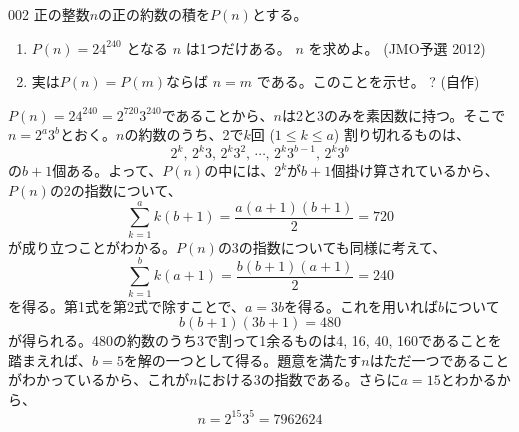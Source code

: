 \begin{thm}{002}{}{}
 正の整数$n$の正の約数の積を$P(n)$とする。
 \begin{enumerate}
  \item $P(n)=24^{240}$ となる $n$ は1つだけある。 $n$ を求めよ。  (JMO予選 2012)
  \item 実は$P(n)=P(m)$ならば $n=m$ である。このことを示せ。 \hosi ? (自作)
 \end{enumerate}
\end{thm}

$P(n)=24^{240}=2^{720} 3^{240}$であることから、$n$は2と3のみを素因数に持つ。そこで$n=2^a 3^b$とおく。$n$の約数のうち、2で$k$回 ($1\le k\le a$) 割り切れるものは、
\[ 2^k,\, 2^k 3,\, 2^k 3^2,\, \cdots,\, 2^k 3^{b-1},\, 2^k 3^b \]
の$b+1$個ある。よって、$P(n)$の中には、$2^k$が$b+1$個掛け算されているから、$P(n)$の2の指数について、
\[ \sum_{k=1}^a k(b+1) = \frac{a(a+1)(b+1)}{2} = 720 \]
が成り立つことがわかる。$P(n)$の3の指数についても同様に考えて、
\[ \sum_{k=1}^b k(a+1) = \frac{b(b+1)(a+1)}{2} = 240 \]
を得る。第1式を第2式で除すことで、$a=3b$を得る。これを用いれば$b$について
\[ b(b+1)(3b+1)=480 \]
が得られる。480の約数のうち3で割って1余るものは4, 16, 40, 160であることを踏まえれば、$b=5$を解の一つとして得る。題意を満たす$n$はただ一つであることがわかっているから、これが$n$における3の指数である。さらに$a=15$とわかるから、
\[ n=2^{15} 3^5=7962624 \]

